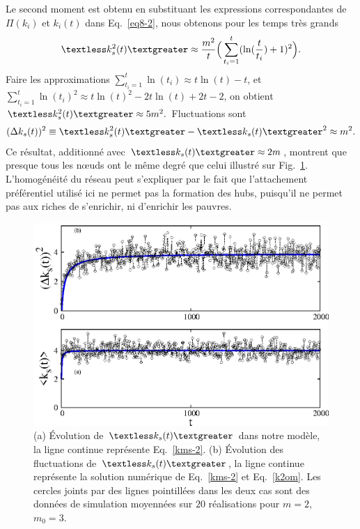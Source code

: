 Le second moment est obtenu en substituant les expressions correspondantes de $\Pi(k_i)$ et $k_i(t)$ dans Eq.~\ref {eq8-2}, nous obtenons pour les temps très grands
 \begin{eqnarray}
\begin{split}
\kmss\approx \frac{m^2}{t}\Big(\sum_{t_i=1}^t (\ln(\frac{t}{t_i})+1)^2\Big).
\label{k2om}
\end{split}
\end{eqnarray}
Faire les approximations  $\sum_{t_i=1}^t \ln(t_i)\approx t\ln(t)-t$, et
$\sum_{t_i=1}^t \ln(t_i)^2\approx t\ln(t)^2-2t\ln(t)+2t-2$, on obtient $\kmss\approx 5m^2.$ Fluctuations sont 
\begin{eqnarray}
 (\Delta k_s(t))^2 \equiv {\kmss-\kms^2}\approx m^2.
\end{eqnarray}
 Ce résultat, additionné avec $\kms\approx 2m $, montrent que presque tous les nœuds ont le même degré que celui illustré sur Fig.~\ref{fig2b-2}. L'homogénéité du réseau peut s'expliquer par le fait que l'attachement préférentiel utilisé ici ne permet pas la formation des hubs, puisqu'il ne permet pas aux riches de s'enrichir, ni d'enrichir les pauvres. 
\begin{figure}[h]
	\centering
	\includegraphics[scale=1]{./figures/nfig3}
	\caption{(a) Évolution de $\kms$ dans notre modèle, la ligne continue représente Eq.~\ref{kms-2}.
	(b) Évolution des fluctuations de $\kms$, la ligne continue représente la solution numérique de Eq.~\ref{kms-2} et Eq.~\ref{k2om}. Les cercles joints par des lignes pointillées dans les deux cas sont des données de simulation moyennées sur $20$ réalisations pour $m=2$, $m_0=3$.}
	\label{fig2b-2}
\end{figure}
 \vspace{4cm}
